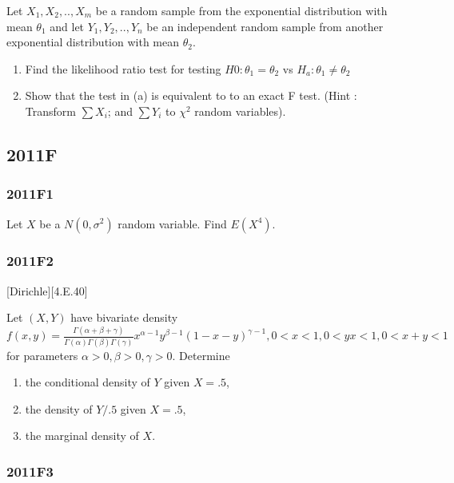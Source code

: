 \documentclass[10pt,twocolumn,portrait]{article}
\begin{document}
Let \(X_1,X_2,..,X_{m}\) be a random sample from the exponential
distribution with mean \(\theta_1\) and let \(Y_1,Y_2,..,Y_{n}\) be an
independent random sample from another exponential distribution with
mean \(\theta_2\).

\begin{enumerate}
\def\labelenumi{(\alph{enumi})}
\item
  Find the likelihood ratio test for testing \(H0:\theta_1=\theta_2\) vs
  \(H_a:\theta_1\neq\theta_2\)
\item
  Show that the test in (a) is equivalent to to an exact F test. (Hint :
  Transform \(\sum X_i\); and \(\sum Y_i\) to \(\chi^2\) random
  variables).
\end{enumerate}

\hypertarget{f-7}{%
\subsection{2011F}\label{f-7}}

\hypertarget{f1-4}{%
\subsubsection{2011F1}\label{f1-4}}

Let \(X\) be a \(N(0,\sigma^2)\) random variable. Find \(E(X^4)\).

\hypertarget{f2-4}{%
\subsubsection{2011F2}\label{f2-4}}

{[}Dirichle{]}{[}4.E.40{]}

Let \((X,Y)\) have bivariate density
\(f(x,y)=\frac{\Gamma(\alpha+\beta+\gamma)}{\Gamma(\alpha)\Gamma(\beta)\Gamma(\gamma)}x^{\alpha-1}y^{\beta-1}(1-x-y)^{\gamma-1},0<x<1,0<yx<1,0<x+y<1\)
for parameters \(\alpha>0,\beta>0,\gamma>0\). Determine

\begin{enumerate}
\def\labelenumi{(\alph{enumi})}
\item
  the conditional density of \(Y\) given \(X=.5\),
\item
  the density of \(Y/.5\) given \(X=.5\),
\item
  the marginal density of \(X\).
\end{enumerate}

\hypertarget{f3-4}{%
\subsubsection{2011F3}\label{f3-4}}
\end{document}
